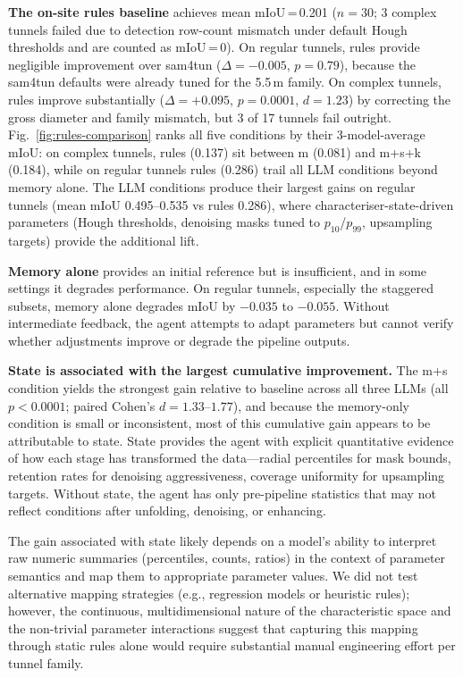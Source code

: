 \documentclass[a4paper,fleqn]{cas-dc}
\begin{document}
\textbf{The on-site rules baseline} achieves mean mIoU\,=\,0.201 ($n=30$; 3 complex tunnels failed due to detection row-count mismatch under default Hough thresholds and are counted as mIoU\,=\,0). On regular tunnels, rules provide negligible improvement over sam4tun ($\Delta = -0.005$, $p = 0.79$), because the sam4tun defaults were already tuned for the 5.5\,m family. On complex tunnels, rules improve substantially ($\Delta = +0.095$, $p = 0.0001$, $d = 1.23$) by correcting the gross diameter and family mismatch, but 3 of 17 tunnels fail outright. Fig.~\ref{fig:rules-comparison} ranks all five conditions by their 3-model-average mIoU: on complex tunnels, rules (0.137) sit between m (0.081) and m+s+k (0.184), while on regular tunnels rules (0.286) trail all LLM conditions beyond memory alone. The LLM conditions produce their largest gains on regular tunnels (mean mIoU 0.495--0.535 vs rules 0.286), where characteriser-state-driven parameters (Hough thresholds, denoising masks tuned to $p_{10}$/$p_{99}$, upsampling targets) provide the additional lift.

\textbf{Memory alone} provides an initial reference but is insufficient, and in some settings it degrades performance. On regular tunnels, especially the staggered subsets, memory alone degrades mIoU by $-0.035$ to $-0.055$. Without intermediate feedback, the agent attempts to adapt parameters but cannot verify whether adjustments improve or degrade the pipeline outputs.

\textbf{State is associated with the largest cumulative improvement.} The m+s condition yields the strongest gain relative to baseline across all three LLMs (all $p < 0.0001$; paired Cohen's $d = 1.33$--$1.77$), and because the memory-only condition is small or inconsistent, most of this cumulative gain appears to be attributable to state. State provides the agent with explicit quantitative evidence of how each stage has transformed the data---radial percentiles for mask bounds, retention rates for denoising aggressiveness, coverage uniformity for upsampling targets. Without state, the agent has only pre-pipeline statistics that may not reflect conditions after unfolding, denoising, or enhancing.

The gain associated with state likely depends on a model's ability to interpret raw numeric summaries (percentiles, counts, ratios) in the context of parameter semantics and map them to appropriate parameter values. We did not test alternative mapping strategies (e.g., regression models or heuristic rules); however, the continuous, multidimensional nature of the characteristic space and the non-trivial parameter interactions suggest that capturing this mapping through static rules alone would require substantial manual engineering effort per tunnel family.
\end{document}
